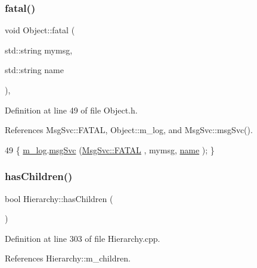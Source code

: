 \subsubsection{\texorpdfstring{fatal()}{fatal()}\hspace{0.1cm}{\footnotesize\ttfamily [2/2]}}
{\footnotesize\ttfamily void Object\+::fatal (\begin{DoxyParamCaption}\item[{std\+::string}]{mymsg,  }\item[{std\+::string}]{name }\end{DoxyParamCaption})\hspace{0.3cm}{\ttfamily [inline]}, {\ttfamily [inherited]}}



Definition at line 49 of file Object.\+h.



References Msg\+Svc\+::\+F\+A\+T\+AL, Object\+::m\+\_\+log, and Msg\+Svc\+::msg\+Svc().


\begin{DoxyCode}
49 \{ \hyperlink{classObject_a0d269813dd7ac1f24bc143031e2963f2}{m\_log}.\hyperlink{classMsgSvc_ad25f18047920cc59a314e5098259711c}{msgSvc} (\hyperlink{classMsgSvc_ae671eb7301996cd049d2da8a65925926a59c73cb29edfc9cdf35845e2b1301363}{MsgSvc::FATAL}   , mymsg, \hyperlink{classObject_a300f4c05dd468c7bb8b3c968868443c1}{name} ); \}
\end{DoxyCode}
\mbox{\label{classHierarchy_a255174fe4d316d2a3f430dcb9dab29f1}} 
\subsubsection{\texorpdfstring{has\+Children()}{hasChildren()}}
{\footnotesize\ttfamily bool Hierarchy\+::has\+Children (\begin{DoxyParamCaption}{ }\end{DoxyParamCaption})\hspace{0.3cm}{\ttfamily [inherited]}}



Definition at line 303 of file Hierarchy.\+cpp.



References Hierarchy\+::m\+\_\+children.



